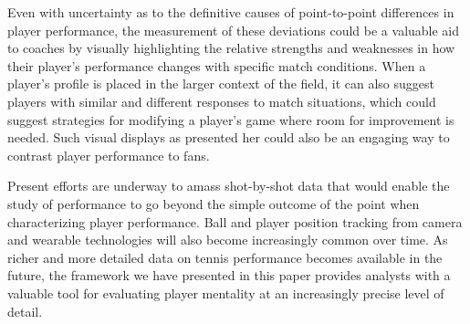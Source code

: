 \documentclass{Latex/svjour3}
\begin{document}
Even with uncertainty as to the definitive causes of point-to-point
differences in player performance, the measurement of these deviations
could be a valuable aid to coaches by visually highlighting the
relative strengths and weaknesses in how their player's performance
changes with specific match conditions. When a player's profile is
placed in the larger context of the field, it can also suggest players
with similar and different responses to match situations, which could
suggest strategies for modifying a player's game where room for
improvement is needed. Such visual displays as presented her could
also be an engaging way to contrast player performance to fans.

Present efforts are underway to amass shot-by-shot data that would
enable the study of performance to go beyond the simple outcome of the
point when characterizing player performance. Ball and player
position tracking from camera and wearable technologies will also
become increasingly common over time. As richer and more detailed data
on tennis performance becomes available in the future, the framework
we have presented in this paper provides analysts with a valuable tool
for evaluating player mentality at an increasingly precise level of detail.


 


\clearpage
\end{document}
